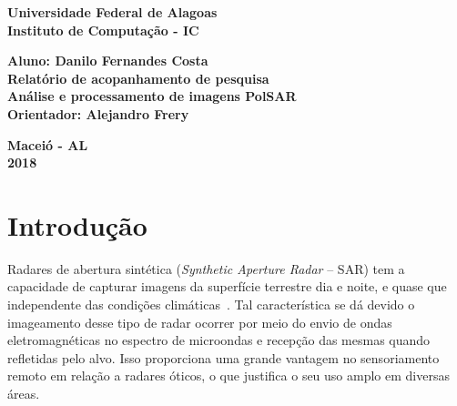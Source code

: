 \documentclass[12pt]{article}
\begin{document}
\begin{titlepage}
\begin{center}

\textbf{\LARGE Universidade Federal de Alagoas } \\[0.5cm]
\textbf{\large Instituto de Computação - IC}\\[0.2cm]

\vspace{20pt}

\vspace{20pt}
\vspace{20pt}
\vspace{20pt}
\vspace{20pt}
\vspace{20pt}
\vspace{20pt}
\vspace{20pt}
\vspace{20pt}

\textbf{\Large Aluno: Danilo Fernandes Costa}\\
\vspace{70pt}
\textbf{\LARGE Relatório de acopanhamento de pesquisa}\\
\vspace{20pt}
\textbf{\Large Análise e processamento de imagens PolSAR}\\
\vspace{70pt}
\textbf{\large Orientador: Alejandro Frery}\\

\vspace{45pt}
\end{center}

\par
\vfill
\begin{center}
\textbf{Maceió - AL}\\
\textbf{2018}
\end{center}

\end{titlepage}

\newpage

\section{Introdução}
Radares de abertura sintética (\textit{Synthetic Aperture Radar} -- SAR) tem a capacidade de capturar imagens da superfície terrestre dia e noite, e quase que independente das condições climáticas~\cite{Shen17}. 
Tal característica se dá devido o imageamento desse tipo de radar ocorrer por meio do envio de ondas eletromagnéticas no espectro de microondas e recepção das mesmas quando refletidas pelo alvo. 
Isso proporciona uma grande vantagem no sensoriamento remoto em relação a radares óticos, o que justifica o seu uso amplo em diversas áreas. 
\end{document}
